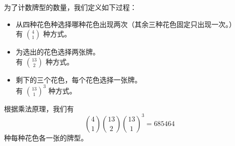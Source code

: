 \begin{example}
    为了计数牌型的数量，我们定义如下过程：
    \begin{itemize}
        \item 从四种花色种选择哪种花色出现两次（其余三种花色固定只出现一次。）\\
              有 ${4 \choose 1}$ 种方式。
        \item 为选出的花色选择两张牌。\\
              有 ${13 \choose 2}$ 种方式。
        \item 剩下的三个花色，每个花色选择一张牌。\\
              有 ${13 \choose 1}^3$ 种方式。
    \end{itemize}
    根据乘法原理，我们有
    \[{4 \choose 1}{13 \choose 2}{13 \choose 1}^3 = 685464\]
    种每种花色各一张的牌型。
\end{example}

